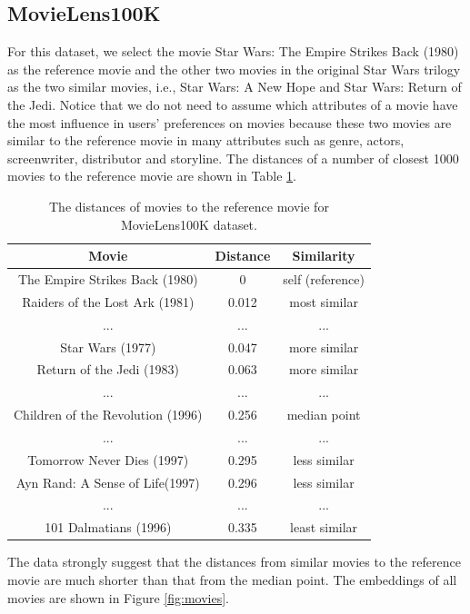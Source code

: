\documentclass[conference]{IEEEtran}
\begin{document}
\subsection{MovieLens100K}
For this dataset, we select the movie Star Wars: The Empire Strikes Back (1980) as the reference movie and the other two movies in the original Star Wars trilogy as the two similar movies, i.e., Star Wars: A New Hope and Star Wars: Return of the Jedi.
Notice that we do not need to assume which attributes of a movie have the most influence in users' preferences on movies because these two movies are similar to the reference movie in many attributes such as genre, actors, screenwriter, distributor and storyline.
The distances of a number of closest 1000 movies to the reference movie are shown in Table \ref{tab:movielens100k-distance}.
\begin{table}[!ht]
	\centering
	\caption{
		The distances of movies to the reference movie for MovieLens100K dataset.
	}
	\begin{tabular}{ccc} \hline \rowcolor{blue!30}
		Movie & Distance & Similarity \\ \hline
		The Empire Strikes Back (1980) & 0 & self (reference) \\ \hline
		Raiders of the Lost Ark (1981) & 0.012 & most similar \\ \hline
		... & ... & ... \\ \hline
		Star Wars (1977) & 0.047 & more similar \\ \hline
		Return of the Jedi (1983) & 0.063 & more similar \\ \hline
		... & ... & ... \\ \hline
		Children of the Revolution (1996) & 0.256 & median point \\ \hline
		... & ... & ... \\ \hline
		Tomorrow Never Dies (1997) & 0.295 & less similar \\ \hline
		Ayn Rand: A Sense of Life(1997) & 0.296 & less similar \\ \hline
		... & ... & ... \\ \hline
		101 Dalmatians (1996) & 0.335 & least similar \\ \hline
	\end{tabular}
	\label{tab:movielens100k-distance}
\end{table}
The data strongly suggest that the distances from similar movies to the reference movie are much shorter than that from the median point.
The embeddings of all movies are shown in Figure \ref{fig:movies}.
\end{document}
